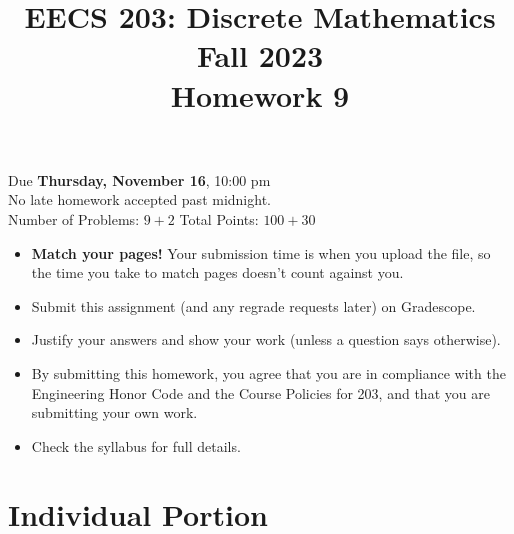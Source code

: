 \documentclass[12pt]{exam}
\begin{document}
\title{EECS 203: Discrete Mathematics\\
  Fall 2023\\
  Homework 9}
\date{}
\author{}
\maketitle
\vspace{-50pt}
\begin{center}
  \huge Due \textbf{Thursday, November 16}, 10:00 pm\\
\Large No late homework accepted past midnight.\\
\vspace{10pt}
\large Number of Problems: $9+2$
\hspace{3cm}
Total Points: $100+30$
\end{center}
\vspace{25pt}
\begin{itemize}
    \item \textbf{Match your pages!} Your submission time is when you upload the file, so the time you take to match pages doesn't count against you.
    \item Submit this assignment (and any regrade requests later) on Gradescope. 
    \item Justify your answers and show your work (unless a question says otherwise).
    \item By submitting this homework, you agree that you are in compliance with the Engineering Honor Code and the Course Policies for 203, and that you are submitting your own work.
    \item Check the syllabus for full details.
\end{itemize}
\newpage

\section*{Individual Portion}
\end{document}
